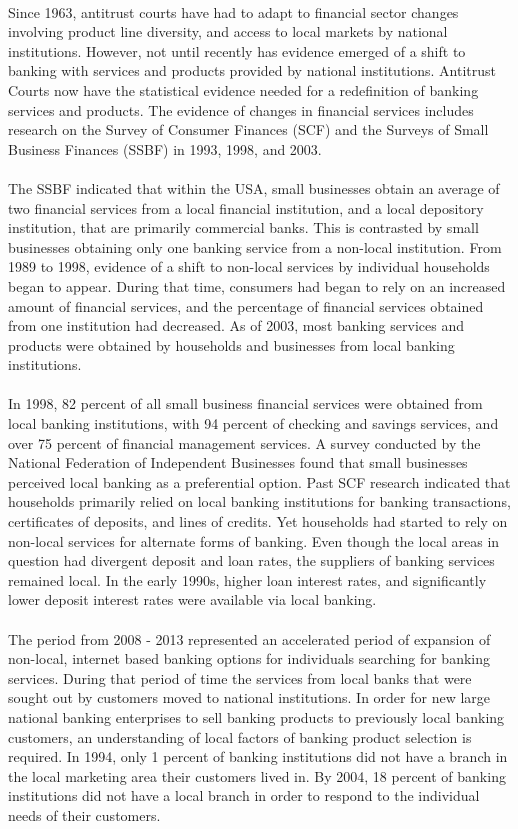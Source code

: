 \\
Since 1963, antitrust courts have had to adapt to financial sector changes involving product line diversity, and access to local markets by national institutions. However, not until recently has evidence emerged of a shift to banking with services and products provided by national institutions. Antitrust Courts now have the statistical evidence needed for a redefinition of banking services and products. The evidence of changes in financial services includes research on the Survey of Consumer Finances (SCF) and the Surveys of Small Business Finances (SSBF) in 1993, 1998, and 2003.
\\
\\
The SSBF indicated that within the USA, small businesses obtain an average of two financial services from a local financial institution, and a local depository institution, that are primarily commercial banks. This is contrasted by small businesses obtaining only one banking service from a non-local institution. From 1989 to 1998, evidence of a shift to non-local services by individual households began to appear. During that time, consumers had began to rely on an increased amount of financial services, and the percentage of financial services obtained from one institution had decreased. As of 2003, most banking services and products were obtained by households and businesses from local banking institutions.
\\
\\
In 1998, 82 percent of all small business financial services were obtained from local banking institutions, with 94 percent of checking and savings services, and over 75 percent of financial management services. A survey conducted by the National Federation of Independent Businesses found that small businesses perceived local banking as a preferential option. Past SCF research indicated that households primarily relied on local banking institutions for banking transactions, certificates of deposits, and lines of credits. Yet households had started to rely on non-local services for alternate forms of banking. Even though the local areas in question had divergent deposit and loan rates, the suppliers of banking services remained local. In the early 1990s, higher loan interest rates, and significantly lower deposit interest rates were available via local banking.
\\
\\
The period from 2008 - 2013 represented an accelerated period of expansion of non-local, internet based banking options for individuals searching for banking services. During that period of time the services from local banks that were sought out by customers moved to national institutions. In order for new large national banking enterprises to sell banking products to previously local banking customers, an understanding of local factors of banking product selection is required. In 1994, only 1 percent of banking institutions did not have a branch in the local marketing area their customers lived in. By 2004, 18 percent of banking institutions did not have a local branch in order to respond to the individual needs of their customers.
